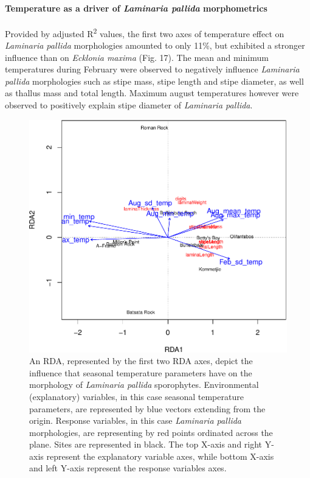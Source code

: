 \documentclass[10pt,a4,]{article}
\makeatletter
\def\maxwidth{\ifdim\Gin@nat@width>\linewidth\linewidth
\else\Gin@nat@width\fi}
\let\Oldincludegraphics\includegraphics
\renewcommand{\includegraphics}[1]{\Oldincludegraphics[width=\maxwidth]{#1}}
\makeatother
\begin{document}
\hypertarget{temperature-as-a-driver-of-laminaria-pallida-morphometrics}{%
\paragraph{\texorpdfstring{Temperature as a driver of \emph{Laminaria
pallida}
morphometrics}{Temperature as a driver of Laminaria pallida morphometrics}}\label{temperature-as-a-driver-of-laminaria-pallida-morphometrics}}

Provided by adjusted R\textsuperscript{2} values, the first two axes of
temperature effect on \emph{Laminaria pallida} morphologies amounted to
only 11\%, but exhibited a stronger influence than on \emph{Ecklonia
maxima} (Fig. 17). The mean and minimum temperatures during February
were observed to negatively influence \emph{Laminaria pallida}
morphologies such as stipe mass, stipe length and stipe diameter, as
well as thallus mass and total length. Maximum august temperatures
however were observed to positively explain stipe diameter of
\emph{Laminaria pallida}.

\begin{figure}
\centering
\includegraphics{chapter_2_files/figure-latex/unnamed-chunk-31-1.pdf}
\caption{An RDA, represented by the first two RDA axes, depict the
influence that seasonal temperature parameters have on the morphology of
\emph{Laminaria pallida} sporophytes. Environmental (explanatory)
variables, in this case seasonal temperature parameters, are represented
by blue vectors extending from the origin. Response variables, in this
case \emph{Laminaria pallida} morphologies, are representing by red
points ordinated across the plane. Sites are represented in black. The
top X-axis and right Y-axis represent the explanatory variable axes,
while bottom X-axis and left Y-axis represent the response variables
axes.}
\end{figure}
\end{document}
